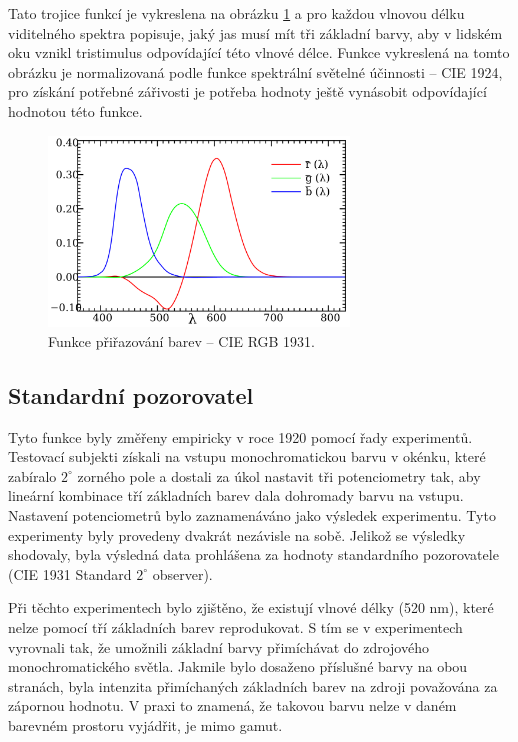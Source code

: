 \documentclass[a4paper, 12pt, titlepage]{article}
\begin{document}
  Tato trojice funkcí je vykreslena na obrázku \ref{fig:RGB_1931} a pro každou vlnovou délku viditelného spektra popisuje, jaký jas musí mít tři základní barvy, aby v lidském oku vznikl tristimulus odpovídající této vlnové délce.
  Funkce vykreslená na tomto obrázku je normalizovaná podle funkce spektrální světelné účinnosti -- CIE 1924, pro získání potřebné zářivosti je potřeba hodnoty ještě vynásobit odpovídající hodnotou této funkce.

  \begin{figure}[h!]
	\centering
	\includegraphics[width=8cm]{CIE1931_RGBCMF.pdf}
	\caption{Funkce přiřazování barev -- CIE RGB 1931.}
	\label{fig:RGB_1931}
	\end{figure}

  \subsection{Standardní pozorovatel}

  Tyto funkce byly změřeny empiricky v roce 1920 pomocí řady experimentů.
  Testovací subjekti získali na vstupu monochromatickou barvu v okénku, které zabíralo $2^\circ$ zorného pole a dostali za úkol nastavit tři potenciometry tak,
  aby lineární kombinace tří základních barev dala dohromady barvu na vstupu.
  Nastavení potenciometrů bylo zaznamenáváno jako výsledek experimentu.
  Tyto experimenty byly provedeny dvakrát nezávisle na sobě.
  Jelikož se výsledky shodovaly, byla výsledná data prohlášena za hodnoty standardního pozorovatele (CIE 1931 Standard $2^\circ$ observer). \cite{Stockman2020, ciexyz}

  Při těchto experimentech bylo zjištěno, že existují vlnové délky (520 nm), které nelze pomocí tří základních barev reprodukovat.
  S tím se v experimentech vyrovnali tak, že umožnili základní barvy přimíchávat do zdrojového monochromatického světla.
  Jakmile bylo dosaženo příslušné barvy na obou stranách, byla intenzita přimíchaných základních barev na zdroji považována za zápornou hodnotu.
  V praxi to znamená, že takovou barvu nelze v daném barevném prostoru vyjádřit, je mimo gamut. \cite{Abraham2016}
\end{document}
